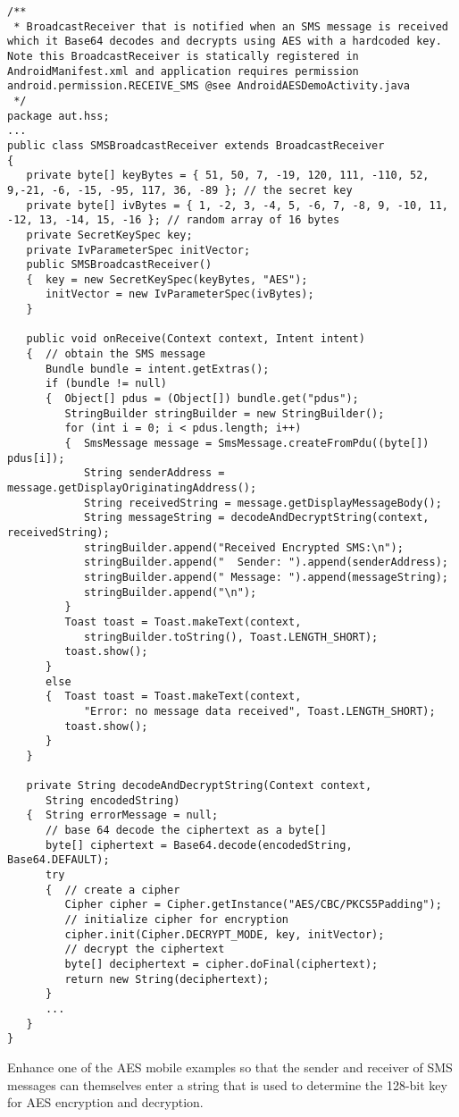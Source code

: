 \begin{lstlisting}[caption=SMS Broadcast Receiver]
/**
 * BroadcastReceiver that is notified when an SMS message is received which it Base64 decodes and decrypts using AES with a hardcoded key. Note this BroadcastReceiver is statically registered in AndroidManifest.xml and application requires permission android.permission.RECEIVE_SMS @see AndroidAESDemoActivity.java
 */
package aut.hss;
...
public class SMSBroadcastReceiver extends BroadcastReceiver
{
   private byte[] keyBytes = { 51, 50, 7, -19, 120, 111, -110, 52, 9,-21, -6, -15, -95, 117, 36, -89 }; // the secret key
   private byte[] ivBytes = { 1, -2, 3, -4, 5, -6, 7, -8, 9, -10, 11, -12, 13, -14, 15, -16 }; // random array of 16 bytes
   private SecretKeySpec key;
   private IvParameterSpec initVector;
   public SMSBroadcastReceiver()
   {  key = new SecretKeySpec(keyBytes, "AES");
      initVector = new IvParameterSpec(ivBytes);
   }

   public void onReceive(Context context, Intent intent)
   {  // obtain the SMS message
      Bundle bundle = intent.getExtras();
      if (bundle != null)
      {  Object[] pdus = (Object[]) bundle.get("pdus");
         StringBuilder stringBuilder = new StringBuilder();
         for (int i = 0; i < pdus.length; i++)
         {  SmsMessage message = SmsMessage.createFromPdu((byte[]) pdus[i]);
            String senderAddress = message.getDisplayOriginatingAddress();
            String receivedString = message.getDisplayMessageBody();
            String messageString = decodeAndDecryptString(context, receivedString);
            stringBuilder.append("Received Encrypted SMS:\n");
            stringBuilder.append("  Sender: ").append(senderAddress);
            stringBuilder.append(" Message: ").append(messageString);
            stringBuilder.append("\n");
         }
         Toast toast = Toast.makeText(context,
            stringBuilder.toString(), Toast.LENGTH_SHORT);
         toast.show();
      }
      else
      {  Toast toast = Toast.makeText(context,
            "Error: no message data received", Toast.LENGTH_SHORT);
         toast.show();
      }
   }

   private String decodeAndDecryptString(Context context,
      String encodedString)
   {  String errorMessage = null;
      // base 64 decode the ciphertext as a byte[]
      byte[] ciphertext = Base64.decode(encodedString, Base64.DEFAULT);
      try
      {  // create a cipher
         Cipher cipher = Cipher.getInstance("AES/CBC/PKCS5Padding");
         // initialize cipher for encryption
         cipher.init(Cipher.DECRYPT_MODE, key, initVector);
         // decrypt the ciphertext
         byte[] deciphertext = cipher.doFinal(ciphertext);
         return new String(deciphertext);
      }
      ...
   }
}
\end{lstlisting}

\begin{exercise}
Enhance one of the AES mobile examples so that the sender and receiver of SMS messages
can themselves enter a string that is used to determine the 128-bit key for AES encryption
and decryption.
\end{exercise}
